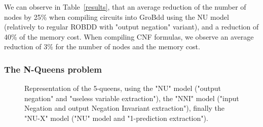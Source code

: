 \documentclass[a4paper,10pt]{article}
\newcommand{\includeframe}[4]{\makebox[#2\linewidth]{\texttt{[image: \#4]}}}
\begin{document}
We can observe in Table~\ref{results}, that an average reduction of the number of nodes by 25\% when compiling circuits into GroBdd using the NU model (relatively to regular ROBDD with "output negation" variant), and a reduction of 40\% of the memory cost.
When compiling CNF formulas, we observe an average reduction of 3\% for the number of nodes and the memory cost.

\subsubsection{The N-Queens problem}

\begin{figure}
\center
\includeframe{1}{0.9}{}{nqueens.pdf}
\caption{Representation of the 5-queens, using the "NU" model ("output negation" and "useless variable extraction"), the "NNI" model ("input Negation and output Negation Invariant extraction"), finally the "NU-X" model ("NU" model and "1-prediction extraction").
}
\label{figure-nqueens}
\end{figure}
\end{document}
